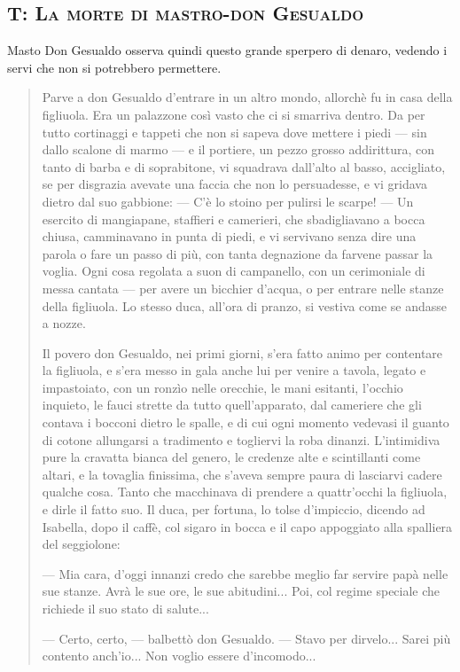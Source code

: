 \documentclass{book}
\newcounter{mar}
\begin{document}
\subsection{T: \textsc{La morte di mastro-don Gesualdo}}

Masto Don Gesualdo osserva quindi questo grande sperpero di denaro,
vedendo i servi che non si potrebbero permettere.

\begin{quote}
Parve a don Gesualdo d’entrare in un altro mondo, allorchè fu in casa della figliuola. Era un palazzone così vasto che ci si smarriva dentro. Da per tutto cortinaggi e tappeti che non si sapeva dove mettere i piedi — sin dallo scalone di marmo — e il portiere, un pezzo grosso addirittura, con tanto di barba e di soprabitone, vi squadrava dall’alto al basso, accigliato, se per disgrazia avevate una faccia che non lo persuadesse, e vi gridava dietro dal suo gabbione: — C’è lo stoino per pulirsi le scarpe! — Un esercito di mangiapane, staffieri e camerieri, che sbadigliavano a bocca chiusa, camminavano in punta di piedi, e vi servivano senza dire una parola o fare un passo di più, con tanta degnazione da farvene passar la voglia. Ogni cosa regolata a suon di campanello, con un cerimoniale di messa cantata — per avere un bicchier d’acqua, o per entrare nelle stanze della figliuola. Lo stesso duca, all’ora di pranzo, si vestiva come se andasse a nozze.

Il povero don Gesualdo, nei primi giorni, s’era fatto animo per contentare la figliuola, e s’era messo in gala anche lui per venire a tavola, legato e impastoiato, con un ronzìo nelle orecchie, le mani esitanti, l’occhio inquieto, le fauci strette da tutto quell’apparato, dal cameriere che gli contava i bocconi dietro le spalle, e di cui ogni momento vedevasi il guanto di cotone allungarsi a tradimento e togliervi la roba dinanzi. L’intimidiva pure la cravatta bianca del genero, le credenze alte e scintillanti come altari, e la tovaglia finissima, che s’aveva sempre paura di lasciarvi cadere qualche cosa. Tanto che macchinava di prendere a quattr’occhi la figliuola, e dirle il fatto suo. Il duca, per fortuna, lo tolse d’impiccio, dicendo ad Isabella, dopo il caffè, col sigaro in bocca e il capo appoggiato alla spalliera del seggiolone:

— Mia cara, d’oggi innanzi credo che sarebbe meglio far servire papà nelle sue stanze. Avrà le sue ore, le sue abitudini... Poi, col regime speciale che richiede il suo stato di salute...

— Certo, certo, — balbettò don Gesualdo. — Stavo per dirvelo... Sarei più contento anch’io... Non voglio essere d’incomodo...


\end{quote}
\end{document}
